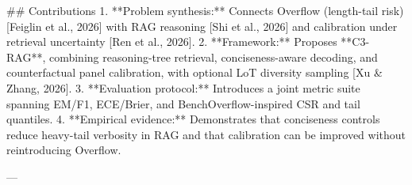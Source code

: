 ## Contributions  
1. **Problem synthesis:** Connects Overflow (length-tail risk) [Feiglin et al., 2026] with RAG reasoning [Shi et al., 2026] and calibration under retrieval uncertainty [Ren et al., 2026].  
2. **Framework:** Proposes **C3-RAG**, combining reasoning-tree retrieval, conciseness-aware decoding, and counterfactual panel calibration, with optional LoT diversity sampling [Xu & Zhang, 2026].  
3. **Evaluation protocol:** Introduces a joint metric suite spanning EM/F1, ECE/Brier, and BenchOverflow-inspired CSR and tail quantiles.  
4. **Empirical evidence:** Demonstrates that conciseness controls reduce heavy-tail verbosity in RAG and that calibration can be improved without reintroducing Overflow.

---